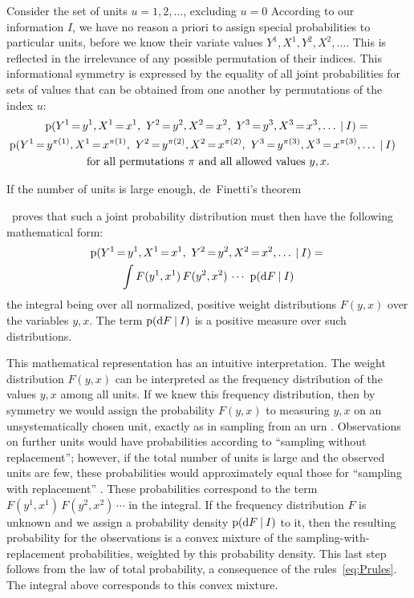 \documentclass[\ifafour a4paper,12pt,\else a5paper,10pt,\fi%
onecolumn,oneside,article,%
british%
]{memoir}
\theoremstyle{remark}
\theoremstyle{innote}
\newcommand*{\ibid}{\unspace\addtocounter{footnote}{-1}\footnotemark{}}
\newcommand*{\di}{\mathrm{d}}%
\newcommand*{\p}{\mathrm{p}}%
\renewcommand*{\|}[1][]{\nonscript\:#1\vert\nonscript\:\mathopen{}}
\newcommand*{\mo}[1][=]{\mathord{\,#1\,}}
\newcommand*{\chap}{ch.}%
\begin{document}
\medskip

Consider the set of units $u=1,2,\dotsc$, excluding $u=0$
According to our information $I$, we have no reason a priori to assign special probabilities to particular units, before we know their variate values $Y^{1},X^{1},Y^{2},X^{2},\dotsc$. This is reflected in the irrelevance of any possible permutation of their indices. This informational symmetry is expressed by the equality of all joint probabilities for sets of values that can be obtained from one another by permutations of the index $u$:
\begin{multline}
  \label{eq:exchang12}
  \p(Y^{1}\mo y^{1},X^{1}\mo x^{1},\ 
  Y^{2}\mo y^{2},X^{2}\mo x^{2},\ 
  Y^{3}\mo y^{3},X^{3}\mo x^{3},\dotsc
  \|I) =
  {}\\
\shoveright{  \p(Y^{1}\mo y^{\pi(1)},X^{1}\mo x^{\pi(1)},\ 
  Y^{2}\mo y^{\pi(2)},X^{2}\mo x^{\pi(2)},\ 
  Y^{3}\mo y^{\pi(3)},X^{3}\mo x^{\pi(3)},\dotsc
  \|I)
}  \\
  \text{for all permutations $\pi$ and all allowed values $y,x$.}
\end{multline}

If the number of units is large enough, de~Finetti's theorem\ibid\ proves that such a joint probability distribution must then have the following mathematical form:
\begin{multline}
  \label{eq:deFinetti_integral}
  \p(Y^{1}\mo y^{1},X^{1}\mo x^{1},\ 
  Y^{2}\mo y^{2},X^{2}\mo x^{2},\dotsc
  \|I) =
  {}\\
  \int
  F(y^{1},x^{1})\, F(y^{2},x^{2})\,\dotsm
\ \p(\di F \|I)
\end{multline}
the integral being over all normalized, positive weight distributions $F(y,x)$ over the variables $y,x$. The term $\p(\di F \|I)$ is a positive measure over such distributions.


This mathematical representation has an intuitive interpretation. The weight distribution $F(y,x)$ can be interpreted as the frequency distribution of the values $y,x$ among all units. If we knew this frequency distribution, then by symmetry we would assign the probability $F(y,x)$ to measuring $y,x$ on an unsystematically chosen unit, exactly as in sampling from an urn \autocites[\chap~3]{jaynes1994_r2003}. Observations on further units would have probabilities according to \enquote{sampling without replacement}; however, if the total number of units is large and the observed units are few, these probabilities would approximately equal those for \enquote{sampling with replacement} \autocites{heathetal1976}[for error bounds see][]{diaconisetal1980}. These probabilities correspond to the term $F(y^{1},x^{1})\, F(y^{2},x^{2})\,\dotsm$ in the integral. If the frequency distribution $F$ is unknown and we assign a probability density $\p(\di F\|I)$ to it, then the resulting probability for the observations is a convex mixture of the sampling-with-replacement probabilities, weighted by this probability density. This last step follows from the law of total probability, a consequence of the rules~\eqref{eq:Prules}. The integral above corresponds to this convex mixture.
\end{document}
